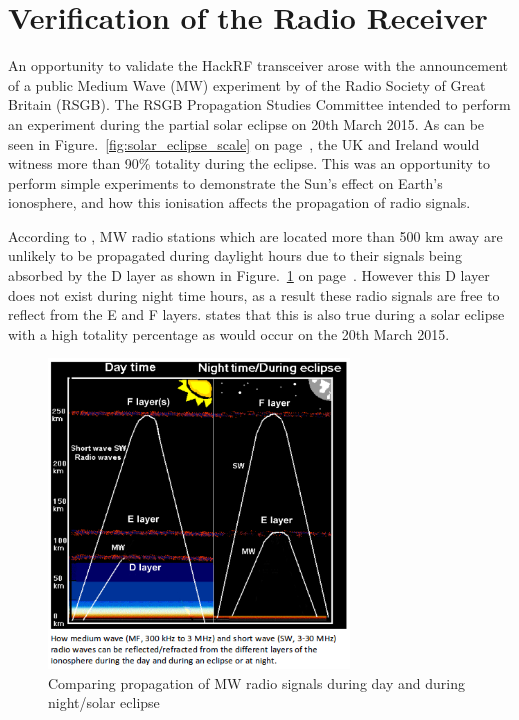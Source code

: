 \section*{Verification of the Radio Receiver}
An opportunity to validate the HackRF transceiver arose with the announcement of a public Medium Wave (\gls{MW}) experiment by \cite{RSGB-15-b} of the Radio Society of Great Britain (\gls{RSGB}). The \gls{RSGB} Propagation Studies Committee intended to perform an experiment during the partial solar eclipse on 20th March 2015. As can be seen in Figure.~\ref{fig:solar_eclipse_scale} on page~\pageref{fig:site_survey_hackrf}, the UK and Ireland would witness more than 90\% totality during the eclipse. This was an opportunity to perform simple experiments to demonstrate the Sun's effect on Earth's ionosphere, and how this ionisation affects the propagation of radio signals.

According to \cite{nichols-15-a}, \gls{MW} radio stations which are located more than 500 km away are unlikely to be propagated during daylight hours due to their signals being absorbed by the D layer as shown in Figure.~\ref{fig:atmosphere_ionisation_effects_mw} on page~\pageref{fig:atmosphere_ionisation_effects_mw}. However this D layer does not exist during night time hours, as a result these radio signals are free to reflect from the E and F layers. \cite{RSGB-15-b} states that this is also true during a solar eclipse with a high totality percentage as would occur on the 20th March 2015.

%
\begin{figure}[!htb]
	\centering
	\includegraphics[width=8cm]{images/53}
	\caption{Comparing propagation of \gls{MW} radio signals during day and during night/solar eclipse \citep{RSGB-15-b}}
	\label{fig:atmosphere_ionisation_effects_mw}
\end{figure}
%

